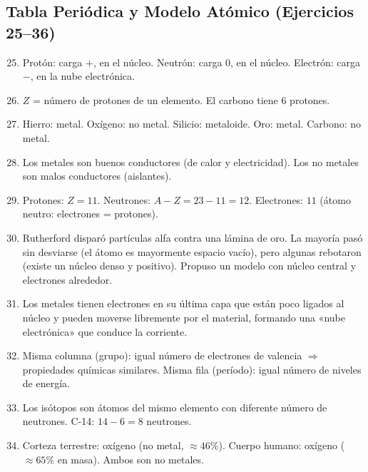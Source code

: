 \documentclass[12pt, a4paper]{article}
\begin{document}
\subsection*{Tabla Periódica y Modelo Atómico (Ejercicios 25--36)}

\begin{enumerate}[leftmargin=*, label=\textbf{\arabic*.}]
  \setcounter{enumi}{24}
  \item Protón: carga $+$, en el núcleo. Neutrón: carga $0$, en el núcleo. Electrón: carga $-$, en la nube electrónica.

  \item $Z$ = número de protones de un elemento. El carbono tiene 6 protones.

  \item Hierro: metal. Oxígeno: no metal. Silicio: metaloide. Oro: metal. Carbono: no metal.

  \item Los metales son buenos conductores (de calor y electricidad). Los no metales son malos conductores (aislantes).

  \item Protones: $Z = 11$. Neutrones: $A - Z = 23 - 11 = 12$. Electrones: $11$ (átomo neutro: electrones = protones).

  \item Rutherford disparó partículas alfa contra una lámina de oro. La mayoría pasó sin desviarse (el átomo es mayormente espacio vacío), pero algunas rebotaron (existe un núcleo denso y positivo). Propuso un modelo con núcleo central y electrones alrededor.

  \item Los metales tienen electrones en su última capa que están poco ligados al núcleo y pueden moverse libremente por el material, formando una «nube electrónica» que conduce la corriente.

  \item Misma columna (grupo): igual número de electrones de valencia $\Rightarrow$ propiedades químicas similares. Misma fila (período): igual número de niveles de energía.

  \item Los isótopos son átomos del mismo elemento con diferente número de neutrones. C-14: $14 - 6 = 8$ neutrones.

  \item Corteza terrestre: oxígeno (no metal, $\approx 46\%$). Cuerpo humano: oxígeno ($\approx 65\%$ en masa). Ambos son no metales.


\end{enumerate}
\end{document}
